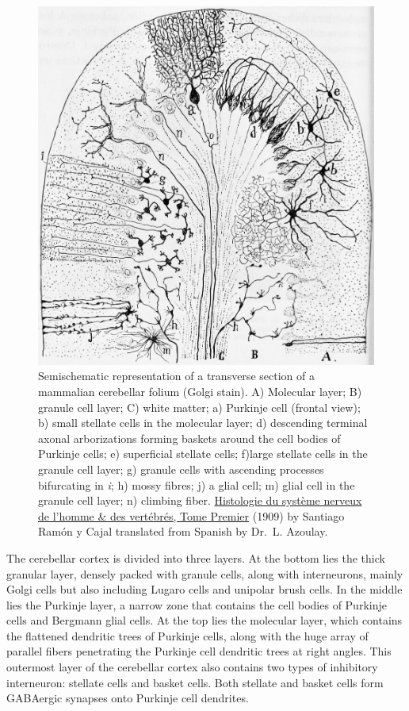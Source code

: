 \begin{figure}

{\centering \includegraphics[width=0.7\linewidth]{./figures/cns/CerebellumCajalManual} 

}

\caption{Semischematic representation of a transverse section of a mammalian cerebellar folium (Golgi stain). A) Molecular layer; B) granule cell layer; C) white matter; a) Purkinje cell (frontal view); b) small stellate cells in the molecular layer; d) descending terminal axonal arborizations forming baskets around the cell bodies of Purkinje cells; e) superficial stellate cells; f)large stellate cells in the granule cell layer; g) granule cells with ascending processes bifurcating in \emph{i}; h) mossy fibres; j) a glial cell; m) glial cell in the granule cell layer; n) climbing fiber. \href{https://wellcomelibrary.org/item/b2129592x\#?c=0\&m=0\&s=0\&cv=14\&z=0\%2C-3.48\%2C1\%2C8.6591}{Histologie du système nerveux de l'homme \& des vertébrés, Tome Premier} (1909) by Santiago Ramón y Cajal translated from Spanish by Dr.~L. Azoulay.}\label{fig:cerebellumfolium}
\end{figure}

The cerebellar cortex is divided into three layers. At the bottom lies the thick granular layer, densely packed with granule cells, along with interneurons, mainly Golgi cells but also including Lugaro cells and unipolar brush cells. In the middle lies the Purkinje layer, a narrow zone that contains the cell bodies of Purkinje cells and Bergmann glial cells. At the top lies the molecular layer, which contains the flattened dendritic trees of Purkinje cells, along with the huge array of parallel fibers penetrating the Purkinje cell dendritic trees at right angles. This outermost layer of the cerebellar cortex also contains two types of inhibitory interneuron: stellate cells and basket cells. Both stellate and basket cells form GABAergic synapses onto Purkinje cell dendrites.

